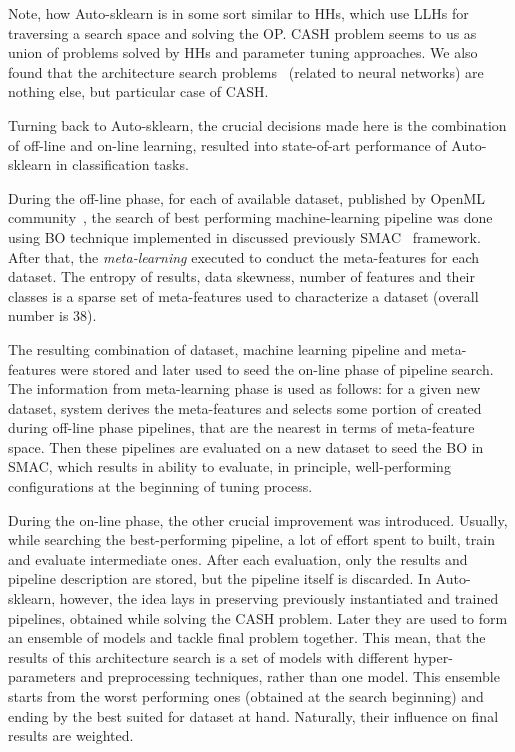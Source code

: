 Note, how Auto-sklearn is in some sort similar to HHs, which use LLHs for traversing a search space and solving the OP. 
CASH problem seems to us as union of problems solved by HHs and parameter tuning approaches. We also found that the architecture search problems~\cite{elsken2018neural} (related to neural networks) are nothing else, but particular case of CASH.


Turning back to Auto-sklearn, the crucial decisions made here is the combination of off-line and on-line learning, resulted into state-of-art performance of Auto-sklearn in classification tasks.

During the off-line phase, for each of available dataset, published by OpenML community~\cite{OpenMLPython2019}, the search of best performing machine-learning pipeline was done using BO technique implemented in discussed previously SMAC~\cite{hutter2011sequential} framework.
After that, the \textit{meta-learning} executed to conduct the meta-features for each dataset. The entropy of results, data skewness, number of features and their classes is a sparse set of meta-features used to characterize a dataset (overall number is 38).

The resulting combination of dataset, machine learning pipeline and meta-features were stored and later used to seed the on-line phase of pipeline search.
The information from meta-learning phase is used as follows: for a given new dataset, system derives the meta-features and selects some portion of created during off-line phase pipelines, that are the nearest in terms of meta-feature space. Then these pipelines are evaluated on a new dataset to seed the BO in SMAC, which results in ability to evaluate, in principle, well-performing configurations at the beginning of tuning process.

During the on-line phase, the other crucial improvement was introduced. 
Usually, while searching the best-performing pipeline, a lot of effort spent to built, train and evaluate intermediate ones. After each evaluation, only the results and pipeline description are stored, but the pipeline itself is discarded. In Auto-sklearn, however, the idea lays in preserving previously instantiated and trained pipelines, obtained while solving the CASH problem. Later they are used to form an ensemble of models and tackle final problem together. This mean, that the results of this architecture search is a set of models with different hyper-parameters and preprocessing techniques, rather than one model. This ensemble starts from the worst performing ones (obtained at the search beginning) and ending by the best suited for dataset at hand. Naturally, their influence on final results are weighted.

